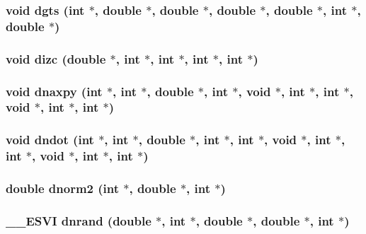 \subsubsection{\setlength{\rightskip}{0pt plus 5cm}void dgts (int $\ast$, double $\ast$, double $\ast$, double $\ast$, double $\ast$, int $\ast$, double $\ast$)}\label{essl_8h_5317fc12cebd25936e7b4fc0924dfeca}


\subsubsection{\setlength{\rightskip}{0pt plus 5cm}void dizc (double $\ast$, int $\ast$, int $\ast$, int $\ast$, int $\ast$)}\label{essl_8h_14b889a277cabdbeee45d92a8d71a6d8}


\subsubsection{\setlength{\rightskip}{0pt plus 5cm}void dnaxpy (int $\ast$, int $\ast$, double $\ast$, int $\ast$, void $\ast$, int $\ast$, int $\ast$, void $\ast$, int $\ast$, int $\ast$)}\label{essl_8h_a3f8beb476172475bbdb80c8c1665b33}


\subsubsection{\setlength{\rightskip}{0pt plus 5cm}void dndot (int $\ast$, int $\ast$, double $\ast$, int $\ast$, int $\ast$, void $\ast$, int $\ast$, int $\ast$, void $\ast$, int $\ast$, int $\ast$)}\label{essl_8h_7e33f3488a451db0d1495f55d5ea66b4}


\subsubsection{\setlength{\rightskip}{0pt plus 5cm}double dnorm2 (int $\ast$, double $\ast$, int $\ast$)}\label{essl_8h_7926f3d0b6337b1bbb7b508941f076ab}


\subsubsection{\setlength{\rightskip}{0pt plus 5cm}\_\-\_\-ESVI dnrand (double $\ast$, int $\ast$, double $\ast$, double $\ast$, int $\ast$)}\label{essl_8h_26ce5674d4af4725d3a10bf54cb721dd}


